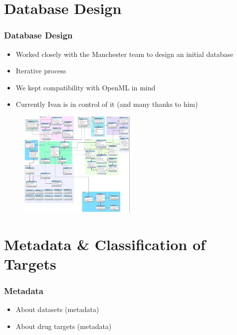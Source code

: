 \documentclass[compress]{beamer}
\begin{document}
\section{Database Design}
\begin{frame}
\frametitle{Database Design} 
\begin{itemize}%
 \item Worked closely with the Manchester team to design an initial database
 \item Iterative process
 \item We kept compatibility with OpenML in mind
 \item Currently Ivan is in control of it (and many thanks to him)
\end{itemize}
\begin{figure}[h!]
  \centering
    \includegraphics[width=0.5\textwidth]{ourdb}
\end{figure}
\end{frame}


\section{Metadata \& Classification of Targets}
\begin{frame}
\frametitle{Metadata} 
\begin{itemize}%
\item About datasets (metadata)
\item About drug targets (metadata)
\end{itemize}



\end{frame}
\end{document}
